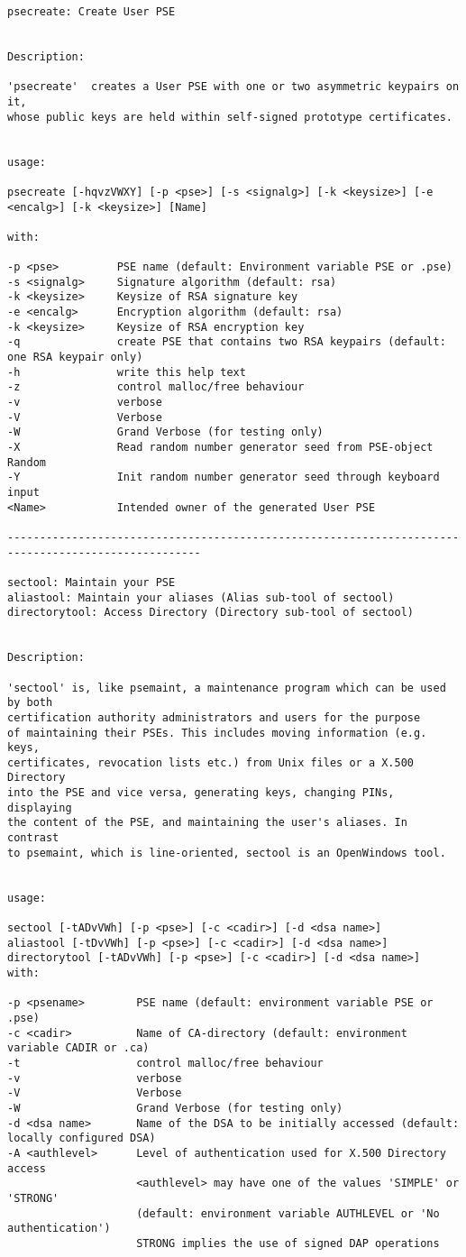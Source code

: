 {\begin{verbatim}
psecreate: Create User PSE


Description:

'psecreate'  creates a User PSE with one or two asymmetric keypairs on it,
whose public keys are held within self-signed prototype certificates.


usage:

psecreate [-hqvzVWXY] [-p <pse>] [-s <signalg>] [-k <keysize>] [-e <encalg>] [-k <keysize>] [Name]

with:

-p <pse>         PSE name (default: Environment variable PSE or .pse)
-s <signalg>     Signature algorithm (default: rsa)
-k <keysize>     Keysize of RSA signature key
-e <encalg>      Encryption algorithm (default: rsa)
-k <keysize>     Keysize of RSA encryption key
-q               create PSE that contains two RSA keypairs (default: one RSA keypair only)
-h               write this help text
-z               control malloc/free behaviour
-v               verbose
-V               Verbose
-W               Grand Verbose (for testing only)
-X               Read random number generator seed from PSE-object Random
-Y               Init random number generator seed through keyboard input
<Name>           Intended owner of the generated User PSE

----------------------------------------------------------------------------------------------------

sectool: Maintain your PSE
aliastool: Maintain your aliases (Alias sub-tool of sectool)
directorytool: Access Directory (Directory sub-tool of sectool)


Description:

'sectool' is, like psemaint, a maintenance program which can be used by both
certification authority administrators and users for the purpose
of maintaining their PSEs. This includes moving information (e.g. keys,
certificates, revocation lists etc.) from Unix files or a X.500 Directory
into the PSE and vice versa, generating keys, changing PINs, displaying
the content of the PSE, and maintaining the user's aliases. In contrast
to psemaint, which is line-oriented, sectool is an OpenWindows tool.


usage:

sectool [-tADvVWh] [-p <pse>] [-c <cadir>] [-d <dsa name>]
aliastool [-tDvVWh] [-p <pse>] [-c <cadir>] [-d <dsa name>]
directorytool [-tADvVWh] [-p <pse>] [-c <cadir>] [-d <dsa name>]
with:

-p <psename>        PSE name (default: environment variable PSE or .pse)
-c <cadir>          Name of CA-directory (default: environment variable CADIR or .ca)
-t                  control malloc/free behaviour
-v                  verbose
-V                  Verbose
-W                  Grand Verbose (for testing only)
-d <dsa name>       Name of the DSA to be initially accessed (default: locally configured DSA)
-A <authlevel>      Level of authentication used for X.500 Directory access
                    <authlevel> may have one of the values 'SIMPLE' or 'STRONG'
                    (default: environment variable AUTHLEVEL or 'No authentication')
                    STRONG implies the use of signed DAP operations


\end{verbatim}}
